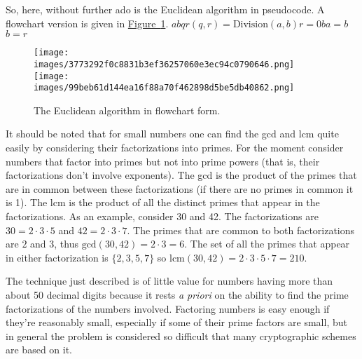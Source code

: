 \documentclass[10pt,]{book}
\theoremstyle{plain}
\theoremstyle{definition}
\theoremstyle{definition}
\numberwithin{equation}{section}
\newcommand{\lcm}[2]{\mbox{lcm} (#1, #2)}
\renewcommand{\gcd}[2]{\mbox{gcd} (#1, #2)}
\begin{document}
    So, here, without further ado is the Euclidean algorithm in
    pseudocode. A flowchart version is given in \hyperref[fig_Euc_alg]{Figure~\ref{fig_Euc_alg}}.
\(a\)\(b\)\(q\)\(r\)\((q,r)  = \mbox{Division} (a,b)\)\(r = 0\)\(b\)\(a = b\)\(b = r\)\leavevmode%
\begin{figure}
\centering
\texttt{[image: images/3773292f0c8831b3ef36257060e3ec94c0790646.png]}
\texttt{[image: images/99beb61d144ea16f88a70f462898d5be5db40862.png]}
\caption{The Euclidean algorithm in flowchart form.\label{fig_Euc_alg}}
\end{figure}
\par

    It should be noted that for small numbers one can find the gcd and lcm
    quite easily by considering their factorizations into primes. For the
    moment consider numbers that factor into primes but not into prime
    powers (that is, their factorizations don't involve exponents). The
    gcd is the product of the primes that are in common between these
    factorizations (if there are no primes in common it is 1). The lcm is
    the product of all the distinct primes
    that appear in the factorizations. As an example, consider 30 and 42.
    The factorizations are \(30 = 2\cdot 3\cdot 5\) and \(42 = 2\cdot 3 \cdot
    7\). The primes that are common to both factorizations are \(2\) and
    \(3\), thus \(\gcd{30}{42} = 2\cdot 3 = 6\). The set of all the primes
    that appear in either factorization is \(\{2, 3, 5, 7 \}\) so
    \(\lcm{30}{42} = 2\cdot 3\cdot 5\cdot 7 = 210\).
\par

    The technique just described is of little value for numbers having more
    than about 50 decimal digits because it rests \emph{a priori} on the
    ability to find the prime factorizations of the numbers involved.
    Factoring numbers is easy enough if they're reasonably small,
    especially if some of their prime factors are small, but in general
    the problem is considered so difficult that many cryptographic schemes
    are based on it.
\typeout{************************************************}
\typeout{************************************************}
\end{document}
